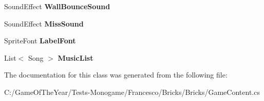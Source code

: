 \begin{DoxyCompactItemize}
\mbox{\label{class_bricks_1_1_game_content_a8c9f7923d6bb737be1bd05c8f30f02ee}} 
Sound\+Effect {\bfseries Wall\+Bounce\+Sound}
\item 
\mbox{\label{class_bricks_1_1_game_content_a9f6d04b9af5b4c5787e0b20a44cbb8bd}} 
Sound\+Effect {\bfseries Miss\+Sound}
\item 
\mbox{\label{class_bricks_1_1_game_content_a3371f83e49de0394cf88d4a246a30301}} 
Sprite\+Font {\bfseries Label\+Font}
\item 
\mbox{\label{class_bricks_1_1_game_content_aa79a35009d99c48f4eb0ba7ff7564638}} 
List$<$ Song $>$ {\bfseries Music\+List}
\end{DoxyCompactItemize}


The documentation for this class was generated from the following file\+:\begin{DoxyCompactItemize}
\item 
C\+:/\+Game\+Of\+The\+Year/\+Tests-\/\+Monogame/\+Francesco/\+Bricks/\+Bricks/Game\+Content.\+cs\end{DoxyCompactItemize}
